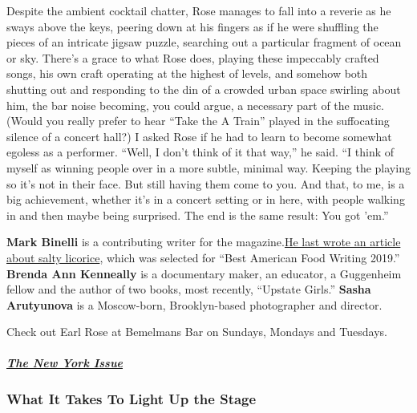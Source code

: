 Despite the ambient cocktail chatter, Rose manages to fall into a
reverie as he sways above the keys, peering down at his fingers as if he
were shuffling the pieces of an intricate jigsaw puzzle, searching out a
particular fragment of ocean or sky. There's a grace to what Rose does,
playing these impeccably crafted songs, his own craft operating at the
highest of levels, and somehow both shutting out and responding to the
din of a crowded urban space swirling about him, the bar noise becoming,
you could argue, a necessary part of the music. (Would you really prefer
to hear ``Take the A Train'' played in the suffocating silence of a
concert hall?) I asked Rose if he had to learn to become somewhat
egoless as a performer. ``Well, I don't think of it that way,'' he said.
``I think of myself as winning people over in a more subtle, minimal
way. Keeping the playing so it's not in their face. But still having
them come to you. And that, to me, is a big achievement, whether it's in
a concert setting or in here, with people walking in and then maybe
being surprised. The end is the same result: You got 'em.''

\textbf{Mark Binelli} is a contributing writer for the
magazine.\href{https://www.nytimes3xbfgragh.onion/interactive/2018/10/24/magazine/candy-salty-licorice-finland-happiness.html}{He
last wrote an article about salty licorice}, which was selected for
``Best American Food Writing 2019.'' \textbf{Brenda Ann Kenneally} is a
documentary maker, an educator, a Guggenheim fellow and the author of
two books, most recently, ``Upstate Girls.'' \textbf{Sasha Arutyunova}
is a Moscow-born, Brooklyn-based photographer and director.

Check out Earl Rose at Bemelmans Bar on Sundays, Mondays and Tuesdays.

\hypertarget{the-new-york-issue-1}{%
\subparagraph{\texorpdfstring{\href{https://www.nytimes3xbfgragh.onion/interactive/2019/05/30/magazine/performers-new-york.html}{The
New York Issue}}{The New York Issue}}\label{the-new-york-issue-1}}

\hypertarget{what-it-takes-to-light-up-the-stage-1}{%
\subsubsection{What It Takes To Light Up the
Stage}\label{what-it-takes-to-light-up-the-stage-1}}

\href{https://www.nytimes3xbfgragh.onion/interactive/2019/05/30/magazine/dance-ballet-new-york.html}{}

